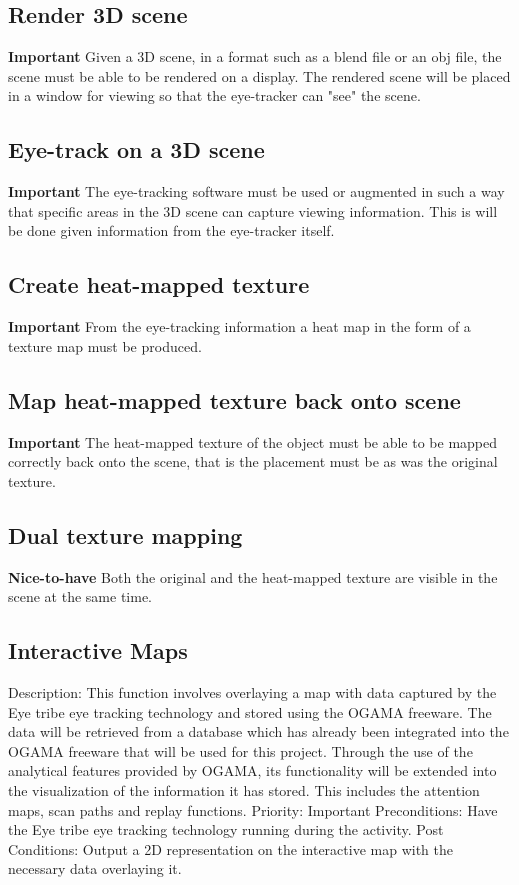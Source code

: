 \subsection{Render 3D scene}
    \textbf{Important}\newline
    Given a 3D scene, in a format such as a blend file or an obj file, the scene must be able to be rendered on a display. The rendered scene will be placed in a window for viewing so that the eye-tracker can "see" the scene.
\subsection{Eye-track on a 3D scene}
    \textbf{Important}\newline
    The eye-tracking software must be used or augmented in such a way that specific areas in the 3D scene can capture viewing information. This is will be done given information from the eye-tracker itself.
\subsection{Create heat-mapped texture}
    \textbf{Important}\newline
    From the eye-tracking information a heat map in the form of a texture map must be produced.
\subsection{Map heat-mapped texture back onto scene}
    \textbf{Important}\newline
    The heat-mapped texture of the object must be able to be mapped correctly back onto the scene, that is the placement must be as was the original texture.
\subsection{Dual texture mapping}
    \textbf{Nice-to-have}\newline
    Both the original and the heat-mapped texture are visible in the scene at the same time.
\subsection{Interactive Maps}
Description: This function involves overlaying a map with data captured by the Eye tribe eye tracking technology and stored using the OGAMA freeware. The data will be retrieved from a database which has already been integrated into the OGAMA freeware that will be used for this project. Through the use of the analytical features provided by OGAMA, its functionality will be extended into the visualization of the information it has stored. This includes the attention maps, scan paths and replay functions.
Priority: Important
Preconditions: Have the Eye tribe eye tracking technology running during the activity.     
Post Conditions: Output a 2D representation on the interactive map with the necessary data overlaying it. 
